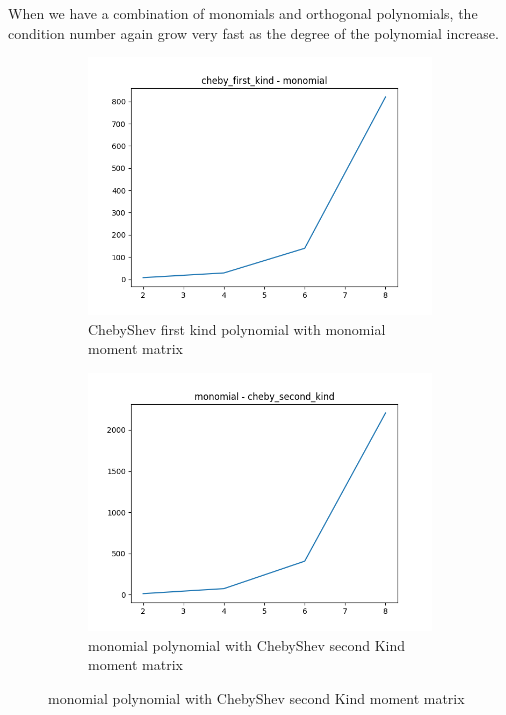 \documentclass[12pt]{amsart}
\numberwithin{equation}{section}
\theoremstyle{definition}
\numberwithin{thm}{section}
\begin{document}
When we have a combination of monomials and orthogonal polynomials, the condition number again grow very fast as
the degree of the polynomial increase. 

\begin{figure}[h]
     \centering
     \begin{subfigure}[b]{0.475\textwidth}
         \centering
         \includegraphics[width=\textwidth]{imgs_biv/cheby_first_kind_monomial.png}
         \caption[ChebyShev First Kind polynomial with monomial moment matrix]%
         {\small ChebyShev first kind polynomial with monomial moment matrix}%

     \end{subfigure}
     \hfill
     \begin{subfigure}[b]{0.475\textwidth}  
         \centering 
         \includegraphics[width=\textwidth]{imgs_biv/monomial_cheby_second_kind.png}
         \caption[monomial polynomial with ChebyShev second Kind moment matrix]%
         {\small monomial polynomial with ChebyShev second Kind moment matrix}%
 

\end{subfigure}
\end{figure}
\end{document}
